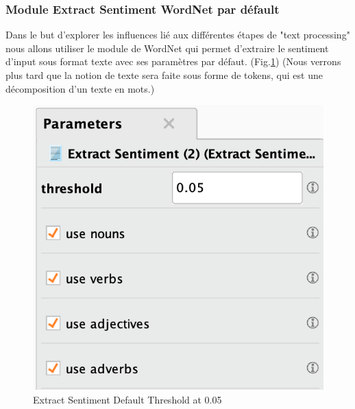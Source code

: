 \documentclass[a4paper]{article}
\begin{document}
\subsubsection{Module Extract Sentiment WordNet par défault}
Dans le but d'explorer les influences lié aux différentes étapes de "text processing" nous allons utiliser le module de WordNet qui permet d'extraire le sentiment d'input sous format texte avec ses paramètres par défaut. (Fig.\ref{fig:3_processing_documents_full_0_05}) (Nous verrons plus tard que la notion de texte sera faite sous forme de tokens, qui est une décomposition d'un texte en mots.)
\begin{figure}[H]
\centering
	\includegraphics[width=\linewidth/3]{imgs/part_3/3_processing_documents_full_0_05}
	\caption{Extract Sentiment Default Threshold at 0.05}
	\label{fig:3_processing_documents_full_0_05}
\end{figure}


\vspace{6pt}
\end{document}
